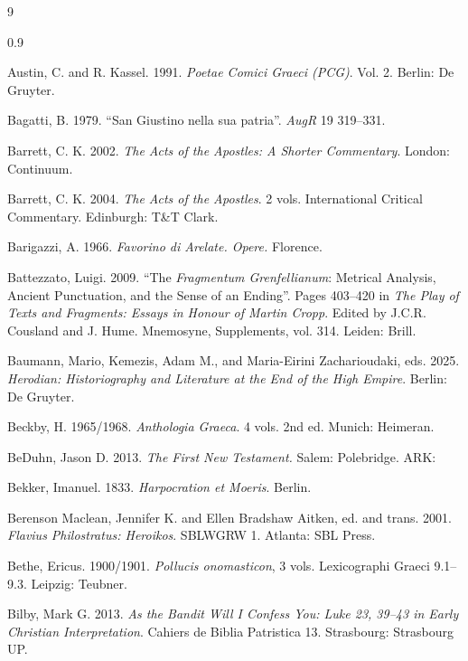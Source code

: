 \begin{thebibliography}{9}
\begin{spacing}{0.9}
\begin{small}
Austin, C. and R. Kassel. 1991. %
\textit{Poetae Comici Graeci (PCG)}. %
Vol. 2. Berlin: De Gruyter. %

Bagatti, B. 1979. %
“San Giustino nella sua patria”. %
\textit{AugR} 19 319–331. %

Barrett, C. K. 2002. %
\textit{The Acts of the Apostles: A Shorter Commentary}. %
London: Continuum. %

Barrett, C. K. 2004. %
\textit{The Acts of the Apostles}. 2 vols. %
International Critical Commentary. %
Edinburgh: T\&T Clark. %

Barigazzi, A. 1966. %
\textit{Favorino di Arelate. Opere.} %
Florence. %

Battezzato, Luigi. 2009. %
“The \textit{Fragmentum Grenfellianum}: Metrical Analysis, Ancient Punctuation, and the Sense of an Ending”. %
Pages 403--420 in \textit{The Play of Texts and Fragments: Essays in Honour of Martin Cropp}. %
Edited by J.C.R. Cousland and J. Hume. %
Mnemosyne, Supplements, vol. 314. %
Leiden: Brill. %

Baumann, Mario, Kemezis, Adam M., and Maria-Eirini Zacharioudaki, eds. 2025. %
\textit{Herodian: Historiography and Literature at the End of the High Empire}. %
Berlin: De Gruyter. %

Beckby, H. 1965/1968. %
\textit{Anthologia Graeca}. 4 vols. %
2nd ed. %
Munich: Heimeran. %

BeDuhn, Jason D. 2013. %
\textit{The First New Testament.} %
Salem: Polebridge. %
ARK:  %

Bekker, Imanuel. 1833. %
\textit{Harpocration et Moeris}. %
Berlin. %

Berenson Maclean, Jennifer K. and Ellen Bradshaw Aitken, ed. and trans. 2001. %
\textit{Flavius Philostratus: Heroikos}. %
SBLWGRW 1. Atlanta: SBL Press. %

Bethe, Ericus. 1900/1901. %
\textit{Pollucis onomasticon}, 3 vols. %
Lexicographi Graeci 9.1--9.3. %
Leipzig: Teubner. %

Bilby, Mark G. 2013. \textit{As the Bandit Will I Confess You: %
Luke 23, 39--43 in Early Christian Interpretation}. %
Cahiers de Biblia Patristica 13. %
Strasbourg: Strasbourg UP. %


\end{small}
\end{spacing}
\end{thebibliography}
